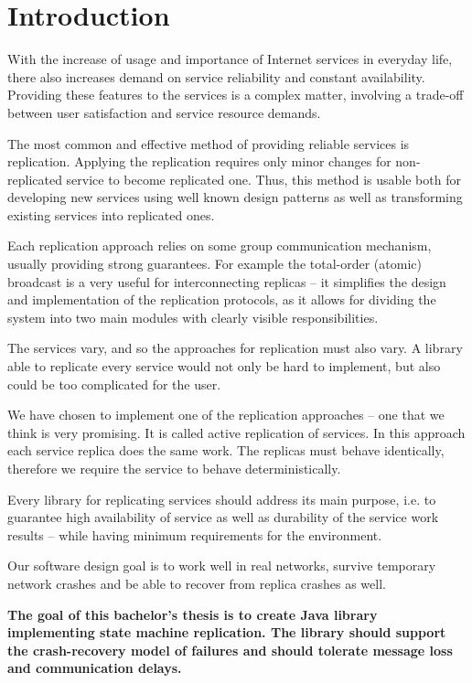 
\chapter{Introduction}

With the increase of usage and importance of Internet services in everyday life, there also increases demand on service reliability and constant availability.
Providing these features to the services is a complex matter, involving a trade-off between user satisfaction and service resource demands.

The most common and effective method of providing reliable services is replication. Applying the replication requires only minor changes for non-replicated service to become replicated one. Thus, this method is usable both for developing new services using well known design patterns as well as transforming existing services into replicated ones.

Each replication approach relies on some group communication mechanism, usually providing strong guarantees. For example the total-order (atomic) broadcast is a very useful for interconnecting replicas -- it simplifies the design and implementation of the replication protocols, as it allows for dividing the system into two main modules with clearly visible responsibilities.

The services vary, and so the approaches for replication must also vary. A library able to replicate every service would not only be hard to implement, but also could be too complicated for the user.

We have chosen to implement one of the replication approaches -- one that we think is very promising.
It is called active replication of services. In this approach each service replica does the same work. The replicas must behave identically, therefore we require the service to behave deterministically.

Every library for replicating services should address its main purpose, i.e. to guarantee high availability of service as well as durability of the service work results
 -- while having minimum requirements for the environment. %

Our software design goal is to work well in real networks, %
survive temporary network crashes and be able to recover from replica crashes as well.

{
\bfseries
The goal of this bachelor's thesis is to create Java library implementing state machine replication. The library should support the crash-recovery model of failures and should tolerate message loss and communication delays.
}

